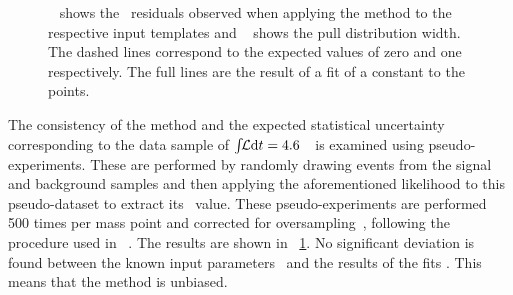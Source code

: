 \begin{figure}[tbp!]
\centering
{}
\caption[\mt\ residuals and pull widths for $\sqrts=7$~\TeV\ data]{
%
\Fig~ shows the \mt\ residuals observed when applying the method to the respective input templates and \fig~ shows the pull distribution width.
%
The dashed lines correspond to the expected values of zero and one respectively. The full lines are the result of a fit of a constant to the points. 
%
\label{fig:pulls7TeV}
}
\end{figure}
%
The consistency of the method and the expected statistical uncertainty corresponding to the data sample of $\int\!\!{\mathcal L}\mathrm{d}t=4.6$~\invfb\ is examined using pseudo-experiments. 
%
These are performed by randomly drawing events from the signal and background samples and then applying the aforementioned likelihood to this pseudo-dataset to extract its \mt\ value. 
%
These pseudo-experiments are performed 500 times per mass point and corrected for oversampling~\cite{BarlowCF}, following the procedure used in ~\cite{Maier2012}. The results are shown in \fig~\ref{fig:pulls7TeV}. No significant deviation is found between the known input parameters \mtin\ and the results of the fits \mtout. This means that the method is unbiased.
